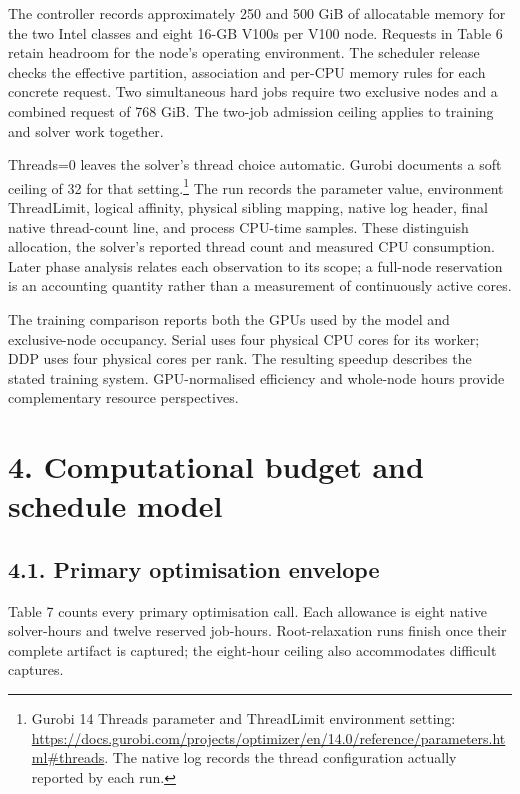 \documentclass[
  british,
  10pt,
]{article}
\begin{document}
The controller records approximately 250 and 500 GiB of allocatable
memory for the two Intel classes and eight 16-GB V100s per V100 node.
Requests in Table 6 retain headroom for the node's operating
environment. The scheduler release checks the effective partition,
association and per-CPU memory rules for each concrete request. Two
simultaneous hard jobs require two exclusive nodes and a combined
request of 768 GiB. The two-job admission ceiling applies to training
and solver work together.

Threads=0 leaves the solver's thread choice automatic. Gurobi documents
a soft ceiling of 32 for that setting.\footnote{Gurobi 14 Threads
  parameter and ThreadLimit environment setting:
  \url{https://docs.gurobi.com/projects/optimizer/en/14.0/reference/parameters.html\#threads}.
  The native log records the thread configuration actually reported by
  each run.} The run records the parameter value, environment
ThreadLimit, logical affinity, physical sibling mapping, native log
header, final native thread-count line, and process CPU-time samples.
These distinguish allocation, the solver's reported thread count and
measured CPU consumption. Later phase analysis relates each observation
to its scope; a full-node reservation is an accounting quantity rather
than a measurement of continuously active cores.

The training comparison reports both the GPUs used by the model and
exclusive-node occupancy. Serial uses four physical CPU cores for its
worker; DDP uses four physical cores per rank. The resulting speedup
describes the stated training system. GPU-normalised efficiency and
whole-node hours provide complementary resource perspectives.

\section{4. Computational budget and schedule
model}\label{computational-budget-and-schedule-model}

\subsection{4.1. Primary optimisation
envelope}\label{primary-optimisation-envelope}

Table 7 counts every primary optimisation call. Each allowance is eight
native solver-hours and twelve reserved job-hours. Root-relaxation runs
finish once their complete artifact is captured; the eight-hour ceiling
also accommodates difficult captures.
\end{document}
